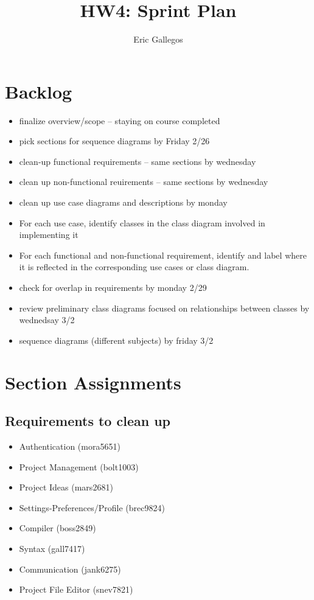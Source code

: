 \documentclass[11pt]{report}
\title{HW4: Sprint Plan}
\author{Eric Gallegos}
\begin{document}
\maketitle


\chapter{Backlog}

\begin{itemize}
    \item finalize overview/scope -- staying on course completed
    \item pick sections for sequence diagrams by Friday 2/26
    \item clean-up functional requirements -- same sections by wednesday
    \item clean up non-functional reuirements -- same sections by wednesday
    \item clean up use case diagrams and descriptions by monday
    \item For each use case, identify classes in the class diagram involved in implementing it
    \item For each functional and non-functional requirement, identify and label where it is reflected in the corresponding use cases or class diagram.
    \item check for overlap in requirements by monday 2/29
    \item review preliminary class diagrams focused on relationships between classes by wednedsay 3/2
    \item sequence diagrams (different subjects) by friday 3/2
\end{itemize}

\chapter{Section Assignments}

\section{Requirements to clean up}

\begin{itemize}
    \item Authentication                (mora5651)
    \item Project Management            (bolt1003)
    \item Project Ideas                 (mars2681)
    \item Settings-Preferences/Profile  (brec9824)
    \item Compiler                      (boss2849)
    \item Syntax                        (gall7417)
    \item Communication                 (jank6275)
    \item Project File Editor           (snev7821)
\end{itemize}
\end{document}
